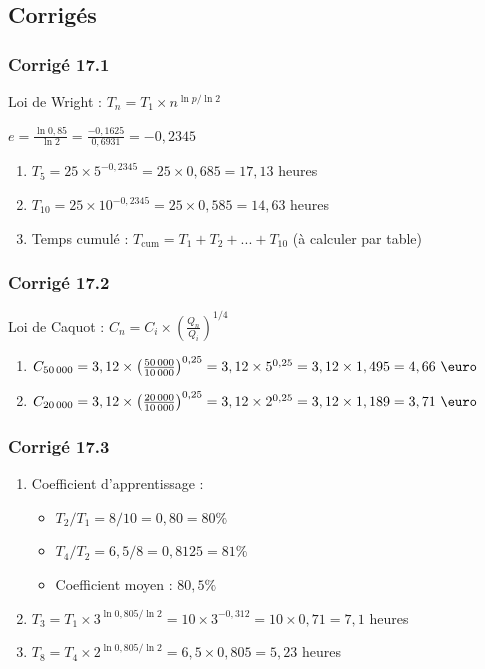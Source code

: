 \documentclass[a4paper,12pt]{article}
\begin{document}
\subsection{Corrigés}

\subsubsection*{Corrigé 17.1}

Loi de Wright : $T_n = T_1 \times n^{\ln p / \ln 2}$

$e = \frac{\ln 0,85}{\ln 2} = \frac{-0,1625}{0,6931} = -0,2345$

\begin{enumerate}
    \item $T_5 = 25 \times 5^{-0,2345} = 25 \times 0,685 = 17,13$ heures
    \item $T_{10} = 25 \times 10^{-0,2345} = 25 \times 0,585 = 14,63$ heures
    \item Temps cumulé : $T_{\text{cum}} = T_1 + T_2 + ... + T_{10}$ (à calculer par table)
\end{enumerate}

\subsubsection*{Corrigé 17.2}

Loi de Caquot : $C_n = C_i \times \left(\frac{Q_n}{Q_i}\right)^{1/4}$

\begin{enumerate}
    \item $C_{50\,000} = 3,12 \times \left(\frac{50\,000}{10\,000}\right)^{0,25} = 3,12 \times 5^{0,25} = 3,12 \times 1,495 = 4,66\ \text{\euro}$
    \item $C_{20\,000} = 3,12 \times \left(\frac{20\,000}{10\,000}\right)^{0,25} = 3,12 \times 2^{0,25} = 3,12 \times 1,189 = 3,71\ \text{\euro}$
\end{enumerate}

\subsubsection*{Corrigé 17.3}

\begin{enumerate}
    \item Coefficient d'apprentissage :
    \begin{itemize}
        \item $T_2/T_1 = 8/10 = 0,80 = 80\%$
        \item $T_4/T_2 = 6,5/8 = 0,8125 = 81\%$
        \item Coefficient moyen : $80,5\%$
    \end{itemize}
    \item $T_3 = T_1 \times 3^{\ln 0,805 / \ln 2} = 10 \times 3^{-0,312} = 10 \times 0,71 = 7,1$ heures
    \item $T_8 = T_4 \times 2^{\ln 0,805 / \ln 2} = 6,5 \times 0,805 = 5,23$ heures
\end{enumerate}
\end{document}
